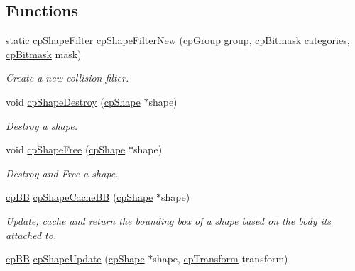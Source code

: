 \subsection*{Functions}
\begin{DoxyCompactItemize}
\item 
\hypertarget{group__cp_shape_ga897e6e7cf0cc8b627ef7e520880457f0}{}static \hyperlink{structcp_shape_filter}{cp\+Shape\+Filter} \hyperlink{group__cp_shape_ga897e6e7cf0cc8b627ef7e520880457f0}{cp\+Shape\+Filter\+New} (\hyperlink{group__basic_types_gacd811b1135a8f4a3e5cc019552b18b1a}{cp\+Group} group, \hyperlink{group__basic_types_gae7ff94f62e00cae288c1991958822743}{cp\+Bitmask} categories, \hyperlink{group__basic_types_gae7ff94f62e00cae288c1991958822743}{cp\+Bitmask} mask)\label{group__cp_shape_ga897e6e7cf0cc8b627ef7e520880457f0}

\begin{DoxyCompactList}\small\item\em Create a new collision filter. \end{DoxyCompactList}\item 
\hypertarget{group__cp_shape_gad4eff5be931cd7c3c5eaf9f431b73c9e}{}void \hyperlink{group__cp_shape_gad4eff5be931cd7c3c5eaf9f431b73c9e}{cp\+Shape\+Destroy} (\hyperlink{structcp_shape}{cp\+Shape} $\ast$shape)\label{group__cp_shape_gad4eff5be931cd7c3c5eaf9f431b73c9e}

\begin{DoxyCompactList}\small\item\em Destroy a shape. \end{DoxyCompactList}\item 
\hypertarget{group__cp_shape_ga5c1eff1ffaf87dda1890fa46ccba38b3}{}void \hyperlink{group__cp_shape_ga5c1eff1ffaf87dda1890fa46ccba38b3}{cp\+Shape\+Free} (\hyperlink{structcp_shape}{cp\+Shape} $\ast$shape)\label{group__cp_shape_ga5c1eff1ffaf87dda1890fa46ccba38b3}

\begin{DoxyCompactList}\small\item\em Destroy and Free a shape. \end{DoxyCompactList}\item 
\hypertarget{group__cp_shape_ga8cff320455af31adba99b4ff70e085a9}{}\hyperlink{structcp_b_b}{cp\+B\+B} \hyperlink{group__cp_shape_ga8cff320455af31adba99b4ff70e085a9}{cp\+Shape\+Cache\+B\+B} (\hyperlink{structcp_shape}{cp\+Shape} $\ast$shape)\label{group__cp_shape_ga8cff320455af31adba99b4ff70e085a9}

\begin{DoxyCompactList}\small\item\em Update, cache and return the bounding box of a shape based on the body it\textquotesingle{}s attached to. \end{DoxyCompactList}\item 
\hypertarget{group__cp_shape_ga24e873bad4887bf0956e475d2a19dbe9}{}\hyperlink{structcp_b_b}{cp\+B\+B} \hyperlink{group__cp_shape_ga24e873bad4887bf0956e475d2a19dbe9}{cp\+Shape\+Update} (\hyperlink{structcp_shape}{cp\+Shape} $\ast$shape, \hyperlink{structcp_transform}{cp\+Transform} transform)\label{group__cp_shape_ga24e873bad4887bf0956e475d2a19dbe9}


\end{DoxyCompactItemize}
